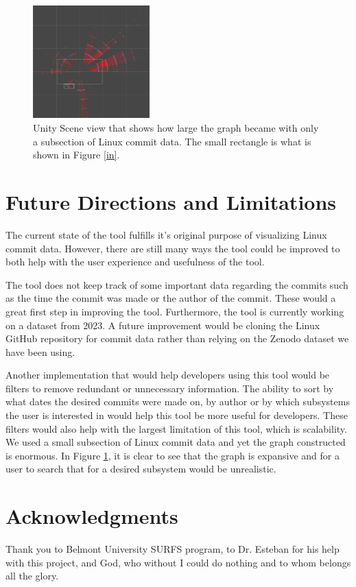 \documentclass[conference]{IEEEtran}
\begin{document}
\begin{figure}[h!]
	\centering
	\includegraphics[width=0.4\textwidth]{wholeThingMostly.png}
	\caption{Unity Scene view that shows how large the graph became with only a subsection of Linux commit data. The small rectangle is what is shown in Figure \ref{in}.}
	\label{out}
\end{figure}

\section{Future Directions and Limitations}
\label{futDir}

The current state of the tool fulfills it's original purpose of visualizing Linux commit data. However, there are still many ways the tool could be improved to both help with the user experience and usefulness of the tool.

The tool does not keep track of some important data regarding the commits such as the time the commit was made or the author of the commit. These would a great first step in improving the tool. Furthermore, the tool is currently working on a dataset from 2023. A future improvement would be cloning the Linux GitHub repository for commit data rather than relying on the Zenodo dataset \cite{zenodo} we have been using.

Another implementation that would help developers using this tool would be filters to remove redundant or unnecessary information. The ability to sort by what dates the desired commits were made on, by author or by which subsystems the user is interested in would help this tool be more useful for developers. These filters would also help with the largest limitation of this tool, which is scalability. We used a small subsection of Linux commit data and yet the graph constructed is enormous. In Figure \ref{out}, it is clear to see that the graph is expansive and for a user to search that for a desired subsystem would be unrealistic. 



\section*{Acknowledgments}
Thank you to Belmont University SURFS program, to Dr. Esteban for his help with this project, and God, who without I could do nothing and to whom belongs all the glory.







\vspace{12pt}
\end{document}
